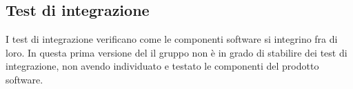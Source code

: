\subsection{Test di integrazione}
I test di integrazione verificano come le componenti software si integrino fra di loro.
In questa prima versione del \PdQv il gruppo non è in grado di stabilire dei test di integrazione, non avendo individuato e testato le componenti del prodotto software.
